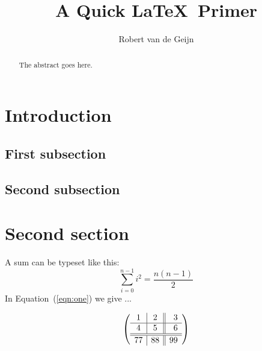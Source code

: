 \documentclass[10pt,a4paper]{article}
\author{Robert van de Geijn}
\title{A Quick \LaTeX\ Primer}
\begin{document}
	\maketitle
	
	\begin{abstract}
		The abstract goes here.
	\end{abstract}
	
	\section{Introduction}
	\subsection{First subsection}
	\subsection{Second subsection}
	
	\section{Second section}
	
	A sum can be typeset like this: 
	\begin{equation}
	\label{eqn:one}
	\sum_{i=0}^{n-1} i^2 
	= \frac{n (n-1)}{2}
	\end{equation}
	In Equation~(\ref{eqn:one}) we give ...
	
	\[
	\left(
	\begin{array}{c | c || r}
	1 & 2 & 3 \\ \hline
	4 & 5 & 6 \\ \hline \hline
	77 & 88 & 99
	\end{array}
	\right)
	\]
	
\end{document}
